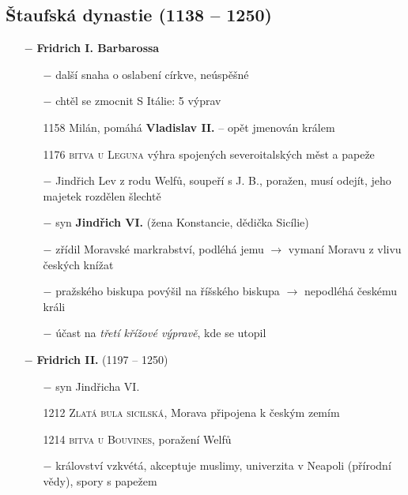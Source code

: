 \documentclass{article}
\begin{document}
\subsection*{Štaufská dynastie (1138 -- 1250)}
\begin{minipage}{0.6\textwidth}
    \begin{itemize}
        \vspace{-0.5em}
        \setlength\itemsep{0.15em}
        \item[$-$] \textbf{Fridrich I. Barbarossa}
            \begin{itemize}
                \vspace{-0.5em}
                \setlength\itemsep{0.15em}
                \item[$-$] další snaha o oslabení církve, neúspěšné
                \item[$-$] chtěl se zmocnit S Itálie: 5 výprav
                \item[1158] Milán, pomáhá \textbf{Vladislav II.} -- opět jmenován králem
                \item[1176] \textsc{bitva u Leguna} výhra spojených severoitalských měst a papeže
                \item[$-$] Jindřich Lev z rodu Welfů, soupeří s J. B., poražen, musí odejít, jeho majetek rozdělen šlechtě
                \item[$-$] syn \textbf{Jindřich VI.} (žena Konstancie, dědička Sicílie)
                \item[$-$] zřídil Moravské markrabství, podléhá jemu $\rightarrow$ vymaní Moravu z vlivu českých knížat
                \item[$-$] pražského biskupa povýšil na říšského biskupa $\rightarrow$ nepodléhá českému králi
                \item[$-$] účast na \textit{třetí křížové výpravě}, kde se utopil
            \end{itemize}
        \item[$-$] \textbf{Fridrich II.} (1197 -- 1250)
            \begin{itemize}
                \vspace{-0.5em}
                \setlength\itemsep{0.15em}
                \item[$-$] syn Jindřicha VI.
                \item[1212] \textsc{Zlatá bula sicilská}, Morava připojena k českým zemím
                \item[1214] \textsc{bitva u Bouvines}, poražení Welfů
                \item[$-$] království vzkvétá, akceptuje muslimy, univerzita v Neapoli (přírodní vědy), spory s papežem

\end{itemize}
\end{itemize}
\end{minipage}
\end{document}
